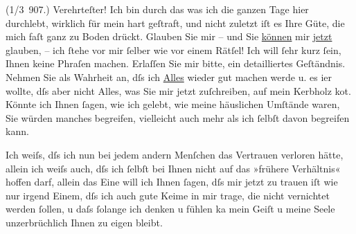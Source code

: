 \pstart
           \centering{}\label{K_L03112-1v}\label{K_L03112-1} (1/3 907.)\pend
           \vspace{0.5em}{\vspace{1\baselineskip}}
\pstart
           Verehrteſter! Ich bin durch das was ich die ganzen
               Tage hier durchlebt, wirklich für mein \label{K_L03112-2v}\label{K_L03112-2} hart geſtraft, und nicht zuletzt iſt es Ihre
               Güte, die mich faſt ganz zu Boden drückt. Glauben Sie mir – und Sie \uline{können} mir \uline{jetzt}
               glauben, – ich{ }ſtehe vor mir{ }ſelber wie vor einem Rätſel! Ich will{ }ſehr kurz{ }ſein,
               Ihnen keine Phraſen machen. Erlaſſen Sie mir bitte, ein detailliertes Geſtänd{\pb}nis. Nehmen Sie als
               Wahrheit an, dſs ich \uline{Alles} wieder gut machen werde u.
               es i{\geminationm}er wollte, dſs aber nicht Alles, was Sie mir jetzt
               zuſchreiben, auf mein Kerbholz ko{\geminationm}t. Könnte ich Ihnen{ }ſagen, wie ich gelebt, wie meine häuslichen Umſtände waren, Sie würden manches
               begreifen, vielleicht auch mehr als ich{ }ſelbſt davon begreifen kann.\pend
           
\pstart
           Ich weiſs, dſs ich nun bei jedem andern Menſchen das Vertrauen verloren hätte, allein
               ich weiſs auch, dſs ich{ }ſelbſt bei Ihnen nicht {\pb}auf das »frühere Verhältnis«
               hoffen darf, allein das Eine will ich Ihnen{ }ſagen, dſs mir jetzt zu trauen iſt wie
               nur irgend Einem, dſs ich auch gute Keime in mir trage, die nicht vernichtet werden{ }ſollen, u daſs{ }ſolange ich denken u fühlen ka{\geminationn} mein
               Geiſt u meine Seele unzerbrüchlich Ihnen zu eigen bleibt.\pend
           
